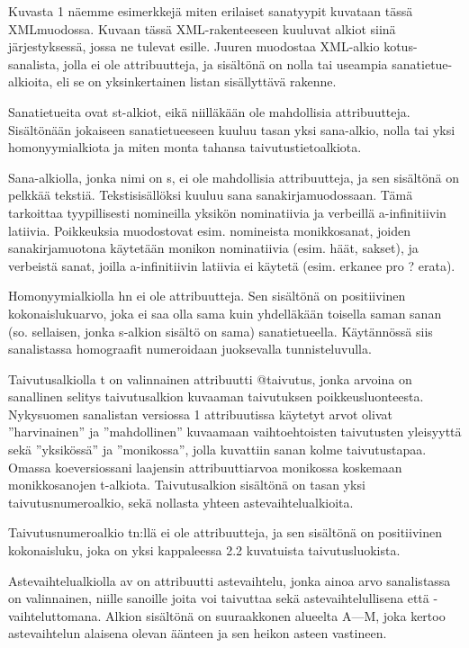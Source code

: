 \documentclass[free]{flammie}
\begin{document}
Kuvasta 1 näemme esimerkkejä miten erilaiset sanatyypit
kuvataan tässä XMLmuodossa. Kuvaan tässä XML-rakenteeseen kuuluvat alkiot siinä
järjestyksessä, jossa ne tulevat esille. Juuren muodostaa XML-alkio
kotus-sanalista, jolla
ei ole attribuutteja, ja sisältönä on nolla tai useampia sanatietue-alkioita, eli se on
yksinkertainen listan sisällyttävä rakenne.

Sanatietueita ovat st-alkiot, eikä niilläkään ole mahdollisia attribuutteja. Sisältönään jokaiseen sanatietueeseen kuuluu tasan yksi sana-alkio, nolla tai yksi homonyymialkiota ja miten monta tahansa taivutustietoalkiota.

Sana-alkiolla, jonka nimi on s, ei ole mahdollisia attribuutteja, ja sen sisältönä on
pelkkää tekstiä. Tekstisisällöksi kuuluu sana sanakirjamuodossaan. Tämä tarkoittaa tyypillisesti nomineilla yksikön nominatiivia ja verbeillä a-infinitiivin latiivia.
Poikkeuksia muodostovat esim. nomineista monikkosanat, joiden sanakirjamuotona käytetään monikon nominatiivia (esim. häät, sakset), ja verbeistä sanat, joilla
a-infinitiivin latiivia ei käytetä (esim. erkanee pro ? erata).

Homonyymialkiolla hn ei ole attribuutteja. Sen sisältönä on positiivinen kokonaislukuarvo, joka ei saa olla sama kuin yhdelläkään toisella saman sanan (so.
sellaisen, jonka s-alkion sisältö on sama) sanatietueella. Käytännössä siis sanalistassa homograafit numeroidaan juoksevalla tunnisteluvulla.

Taivutusalkiolla t on valinnainen attribuutti @taivutus, jonka arvoina
on sanallinen selitys taivutusalkion kuvaaman taivutuksen poikkeusluonteesta. Nykysuomen sanalistan versiossa 1 attribuutissa käytetyt arvot olivat
”harvinainen” ja ”mahdollinen” kuvaamaan vaihtoehtoisten taivutusten
yleisyyttä sekä ”yksikössä” ja ”monikossa”, jolla kuvattiin sanan kolme
taivutustapaa. Omassa koeversiossani laajensin attribuuttiarvoa monikossa koskemaan monikkosanojen t-alkiota. Taivutusalkion sisältönä on tasan yksi taivutusnumeroalkio, sekä nollasta yhteen astevaihtelualkioita.

Taivutusnumeroalkio tn:llä ei ole attribuutteja, ja sen sisältönä on positiivinen
kokonaisluku, joka on yksi kappaleessa 2.2 kuvatuista taivutusluokista.

Astevaihtelualkiolla av on attribuutti astevaihtelu, jonka ainoa arvo sanalistassa on valinnainen, niille sanoille joita voi taivuttaa sekä astevaihtelullisena että -vaihteluttomana. Alkion sisältönä on suuraakkonen alueelta A—M, joka
kertoo astevaihtelun alaisena olevan äänteen ja sen heikon asteen vastineen.
\end{document}

